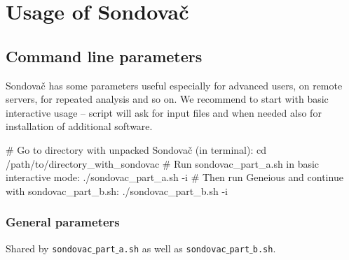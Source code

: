 \documentclass[a4paper, 11pt, twoside]{article}
\begin{document}
\section{Usage of Sondovač}
\label{script-usage}

\subsection{Command line parameters}

Sondovač has some parameters useful especially for advanced users, on remote servers, for repeated analysis and so on. We recommend to start with basic interactive usage -- script will ask for input files and when needed also for installation of additional software.

\begin{bashcode}
  # Go to directory with unpacked Sondovač (in terminal):
  cd /path/to/directory_with_sondovac
  # Run sondovac_part_a.sh in basic interactive mode:
  ./sondovac_part_a.sh -i
  # Then run Geneious and continue with sondovac_part_b.sh:
  ./sondovac_part_b.sh -i
\end{bashcode}

\subsubsection{General parameters}

Shared by \texttt{sondovac$\_$part$\_$a.sh} as well as \texttt{sondovac$\_$part$\_$b.sh}.
\end{document}
